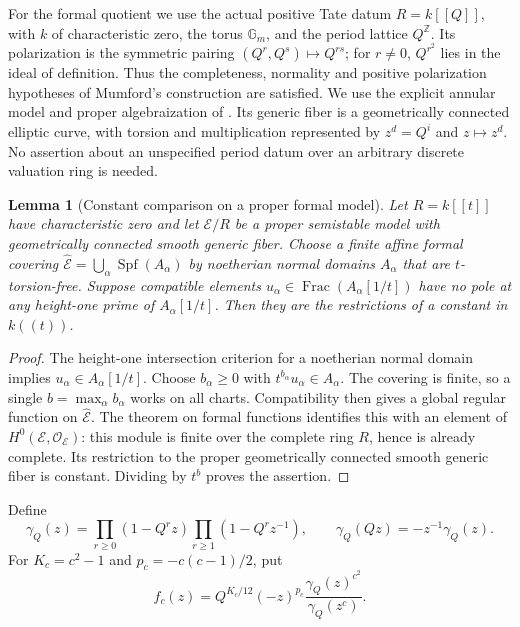\documentclass[11pt]{article}
\newtheorem{lemma}[theorem]{Lemma}
\theoremstyle{remark}\newtheorem{remark}[theorem]{Remark}
\newcommand{\Z}{\mathbb Z}\newcommand{\Q}{\mathbb Q}
\begin{document}
For the formal quotient we use the actual positive Tate datum
$R=k[[Q]]$, with $k$ of characteristic zero, the torus $\mathbb G_m$,
and the period lattice $Q^{\Z}$. Its polarization is the symmetric
pairing $(Q^r,Q^s)\mapsto Q^{rs}$; for $r\ne0$, $Q^{r^2}$ lies in
the ideal of definition. Thus the completeness, normality and positive
polarization hypotheses of Mumford's construction
\cite[Theorem 3.10, Corollary 4.9, Theorem 4.10]{mumford} are satisfied.
We use the explicit annular model and proper algebraization of
\cite[Corollary 2.2.4 and Section 2.5]{conrad}. Its generic fiber is a
geometrically connected elliptic curve, with torsion and multiplication
represented by $z^d=Q^i$ and $z\mapsto z^d$. No assertion about an
unspecified period datum over an arbitrary discrete valuation ring is needed.

\begin{lemma}[Constant comparison on a proper formal model]\label{constant}
Let $R=k[[t]]$ have characteristic zero and let $\mathcal E/R$ be a
proper semistable model with geometrically connected smooth generic
fiber. Choose a finite affine formal covering
$\widehat{\mathcal E}=\bigcup_\alpha\operatorname{Spf}(A_\alpha)$
by noetherian normal domains $A_\alpha$ that are $t$-torsion-free.
Suppose compatible elements
$u_\alpha\in\operatorname{Frac}(A_\alpha[1/t])$ have no pole at any
height-one prime of $A_\alpha[1/t]$. Then they are the restrictions
of a constant in $k((t))$.
\end{lemma}
\begin{proof}
The height-one intersection criterion for a noetherian normal domain
implies $u_\alpha\in A_\alpha[1/t]$. Choose $b_\alpha\geq0$ with
$t^{b_\alpha}u_\alpha\in A_\alpha$. The covering is finite, so a
single $b=\max_\alpha b_\alpha$ works on all charts. Compatibility
then gives a global regular function on $\widehat{\mathcal E}$.
The theorem on formal functions identifies this with an element of
$H^0(\mathcal E,\mathcal O_{\mathcal E})$: this module is finite over
the complete ring $R$, hence is already complete. Its restriction to
the proper geometrically connected smooth generic fiber is constant.
Dividing by $t^b$ proves the assertion.
\end{proof}


Define
\[
 \gamma_Q(z)=\prod_{r\geq0}(1-Q^rz)\prod_{r\geq1}(1-Q^rz^{-1}),
 \qquad \gamma_Q(Qz)=-z^{-1}\gamma_Q(z).
\]
For $K_c=c^2-1$ and $p_c=-c(c-1)/2$, put
\[
 f_c(z)=Q^{K_c/12}(-z)^{p_c}
              \frac{\gamma_Q(z)^{c^2}}{\gamma_Q(z^c)}.
\]
\end{document}
